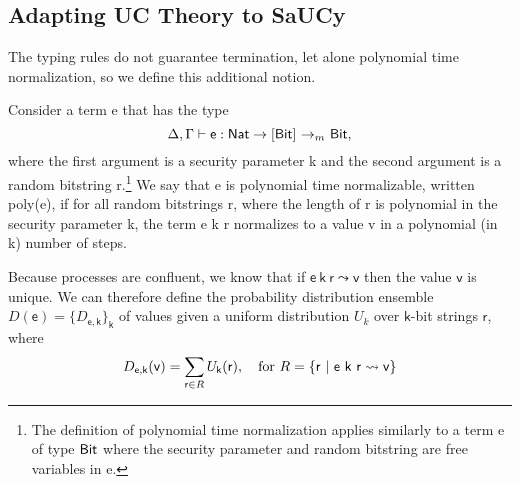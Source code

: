 
\subsection{Adapting UC Theory to SaUCy}
\label{subsec:uc}

The typing rules do not guarantee termination, let alone polynomial time
normalization, so we define this additional notion.

\begin{definition}
  Consider a term \textsf{e} that has the type
  \[\Delta, \Gamma |- \mathsf{e} : \mathsf{Nat} ->[\text{\textsf{Bit}}]\ {->}_m\ \text{\textsf{Bit}},\]
  where the first argument is a security parameter \textsf{k} and the second
  argument is a random bitstring \textsf{r}.\footnote{The definition of
    polynomial time normalization applies similarly to a term \textsf{e} of type
    $\text{\textsf{Bit}}$ where the security parameter and random bitstring are free
    variables in \textsf{e}.} We say that \textsf{e} is polynomial time
  normalizable, written \textsf{poly(e)}, if for all random bitstrings
  \textsf{r}, where the length of \textsf{r} is polynomial in the security
  parameter \textsf{k}, the term \textsf{e k r} normalizes to a value \textsf{v}
  in a polynomial (in \textsf{k}) number of steps.
\end{definition}

\begin{definition} 
  Because processes are confluent, we know that if $\mathsf{e~k~r} \leadsto \mathsf{v}$ then the value $\mathsf{v}$ is unique.
  We can therefore define the probability distribution ensemble $D(\mathsf{e}) = \{ D_{\mathsf{e,k}} \}_\mathsf{k}$ of values given a uniform distribution $U_k$ over $\mathsf{k}$-bit strings $\mathsf{r}$, where
\[
D_{\mathsf{e},\mathsf{k}}(\mathsf{v}) = \sum_{\mathsf{r} \in R} U_{\mathsf{k}}(\mathsf{r}), \quad \textnormal{for~} R = \{ \mathsf{r} ~|~ \mathsf{e~k~r} \leadsto \mathsf{v} \}
\]
\end{definition}

